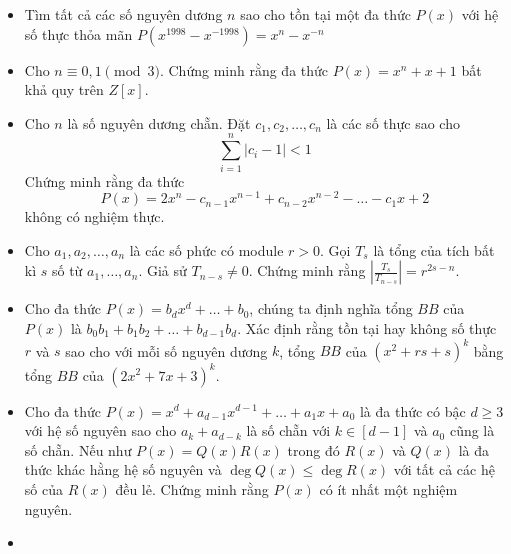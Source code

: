 \documentclass[11pt]{scrartcl}
\begin{document}
\begin{itemize}[label=, leftmargin=0em, itemsep=0.5em]
        \item \begin{btvn}
            Tìm tất cả các số nguyên dương $n$ sao cho tồn tại một đa thức $P(x)$ với hệ số thực thỏa mãn $P(x^{1998} - x^{-1998}) = x^n - x^{-n}$
        \end{btvn}
        \item \begin{btvn}
            Cho $n \equiv 0,1 \pmod{3}$. Chứng minh rằng đa thức $P(x) = x^n + x + 1$ bất khả quy trên $Z[x]$.
        \end{btvn}
        \item \begin{btvn} Cho $n$ là số nguyên dương chẵn. Đặt $c_1,c_2,\dots,c_n$ là các số thực sao cho 
        \[
            \sum_{i = 1}^n |c_i - 1| < 1
        \]
        Chứng minh rằng đa thức 
        \[
            P(x) = 2x^n - c_{n - 1}x^{n - 1} + c_{n - 2}x^{n -2} -\dots-c_1x + 2
        \]
        không có nghiệm thực.
        \end{btvn}
        \item \begin{btvn}
            Cho $a_1,a_2,\dots,a_n$ là các số phức có module $r > 0$. Gọi $T_s$ là tổng của tích bất kì $s$ số từ $a_1,\dots,a_n$. Giả sử $T_{n - s} \neq 0$. Chứng minh rằng $\left|\frac{T_s}{T_{n - s}}\right| = r^{2s - n}$.
        \end{btvn}
        \item \begin{btvn}
            Cho đa thức $P(x) = b_dx^d + \dots + b_0$, chúng ta định nghĩa tổng $BB$ của $P(x)$ là $b_0b_1 + b_1b_2 +\dots+b_{d - 1}b_d$. Xác định rằng tồn tại hay không số thực $r$ và $s$ sao cho với mỗi số nguyên dương $k$, tổng $BB$ của $(x^2 + rs + s)^k$ bằng tổng $BB$ của $(2x^2 + 7x + 3)^k$.
        \end{btvn}
        \item \begin{btvn}
            Cho đa thức $P(x) = x^d + a_{d - 1}x^{ d- 1} + \dots + a_1x + a_0$ là đa thức có bậc $d \geq 3$ với hệ số nguyên sao cho $a_k + a_{d -k}$ là số chẵn với $k \in [d- 1]$ và $a_0$ cũng là số chẵn. Nếu như $P(x) = Q(x)R(x)$ trong đó $R(x)$ và $Q(x)$ là đa thức khác hằng hệ số nguyên và $\deg Q(x) \leq \deg R(x)$ với tất cả các hệ số của $R(x)$ đều lẻ. Chứng minh rằng $P(x)$ có ít nhất một nghiệm nguyên.
        \end{btvn}
        \item \begin{btvn}

\end{btvn}
\end{itemize}
\end{document}
